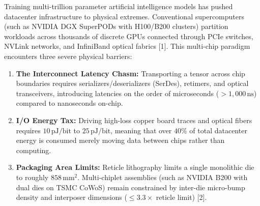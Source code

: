 \documentclass[journal,10pt,twocolumn]{IEEEtran}
\begin{document}
Training multi-trillion parameter artificial intelligence models has pushed datacenter infrastructure to physical extremes. Conventional supercomputers (such as NVIDIA DGX SuperPODs with H100/B200 clusters) partition workloads across thousands of discrete GPUs connected through PCIe switches, NVLink networks, and InfiniBand optical fabrics [1]. This multi-chip paradigm encounters three severe physical barriers:
\begin{enumerate}
  \item \textbf{The Interconnect Latency Chasm:} Transporting a tensor across chip boundaries requires serializers/deserializers (SerDes), retimers, and optical transceivers, introducing latencies on the order of microseconds ($> 1,000\,\text{ns}$) compared to nanoseconds on-chip.
  \item \textbf{I/O Energy Tax:} Driving high-loss copper board traces and optical fibers requires $10\,\text{pJ/bit}$ to $25\,\text{pJ/bit}$, meaning that over $40\%$ of total datacenter energy is consumed merely moving data between chips rather than computing.
  \item \textbf{Packaging Area Limits:} Reticle lithography limits a single monolithic die to roughly $858\,\text{mm}^2$. Multi-chiplet assemblies (such as NVIDIA B200 with dual dies on TSMC CoWoS) remain constrained by inter-die micro-bump density and interposer dimensions ($\le 3.3\times$ reticle limit) [2].
\end{enumerate}
\end{document}
